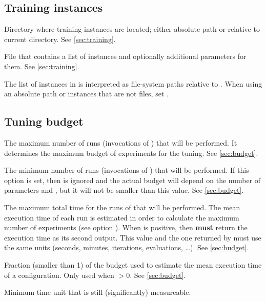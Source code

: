\subsection[Training instances]{Training instances}
\begin{description}
Directory where training instances are located; either absolute path or relative to current directory. See \autoref{sec:training}.

File that contains a list of instances and optionally additional parameters for them. See \autoref{sec:training}.
\begin{xwarningbox}
The list of instances in  is interpreted as file-system paths  relative to . When using an absolute path or instances that are not files, set .
\end{xwarningbox}

\end{description}

\subsection[Tuning budget]{Tuning budget}
\begin{description}
The maximum number of runs (invocations of ) that will be performed. It determines the maximum budget of experiments for the tuning. See \autoref{sec:budget}.

The minimum number of runs (invocations of ) that will be performed. If this option is set, then  is ignored and the actual budget will depend on the number of parameters and , but it will not be smaller than this value. See \autoref{sec:budget}.

The maximum total time for the runs of  that will be  performed. The mean execution time  of each run is estimated in order to calculate the maximum number of experiments (see option ).
  When  is positive, then  \textbf{must} return the execution time as its second output. This value and the one returned by  must use the same units (seconds, minutes, iterations, evaluations, \ldots). See \autoref{sec:budget}.

Fraction (smaller than 1) of the budget used to estimate the mean execution time of a configuration. Only used when  $> 0$. See \autoref{sec:budget}.

Minimum time unit that is still (significantly) measureable.

\end{description}

